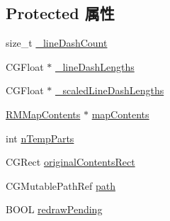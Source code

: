 \subsection*{Protected 属性}
\begin{DoxyCompactItemize}
\item 
size\-\_\-t \hyperlink{interface_r_m_path_ad3e04fb162632bb0b1a16e73e566ca21}{\-\_\-line\-Dash\-Count}
\item 
C\-G\-Float $\ast$ \hyperlink{interface_r_m_path_acf58af65bc4c356e2ef1944810801d13}{\-\_\-line\-Dash\-Lengths}
\item 
C\-G\-Float $\ast$ \hyperlink{interface_r_m_path_aa91685824ea8a4e4d69c76bb64712fc0}{\-\_\-scaled\-Line\-Dash\-Lengths}
\item 
\hyperlink{interface_r_m_map_contents}{R\-M\-Map\-Contents} $\ast$ \hyperlink{interface_r_m_path_ad95b46462e03361c8dd1793ed93358bf}{map\-Contents}
\item 
int \hyperlink{interface_r_m_path_a7c6712af40b4154351635f68812b001c}{n\-Temp\-Parts}
\item 
C\-G\-Rect \hyperlink{interface_r_m_path_a94e057a30ec95a4d5b29d32db112ed68}{original\-Contents\-Rect}
\item 
C\-G\-Mutable\-Path\-Ref \hyperlink{interface_r_m_path_ae603ad2b9d405ea3eed4639f5fff4cd7}{path}
\item 
B\-O\-O\-L \hyperlink{interface_r_m_path_a01f6bb4208525cf246b68cdf8f6bf510}{redraw\-Pending}
\end{DoxyCompactItemize}

